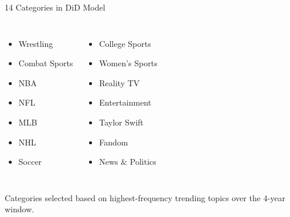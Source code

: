 \documentclass[aspectratio=169,t]{beamer}
\begin{document}
\begin{frame}{14 Categories in DiD Model}
\vspace{0.5em}
\begin{columns}[T]
    \begin{itemize}\setlength\itemsep{0.45em}\small
      \item Wrestling
      \item Combat Sports
      \item NBA
      \item NFL
      \item MLB
      \item NHL
      \item Soccer
    \end{itemize}

    \begin{itemize}\setlength\itemsep{0.45em}\small
      \item College Sports
      \item Women's Sports
      \item Reality TV
      \item Entertainment
      \item Taylor Swift
      \item Fandom
      \item News \& Politics
    \end{itemize}
\end{columns}
\vspace{2em}
{\scriptsize\textcolor{utepsilver}{Categories selected based on highest-frequency trending topics over the 4-year window.}}
\end{frame}
\end{document}
